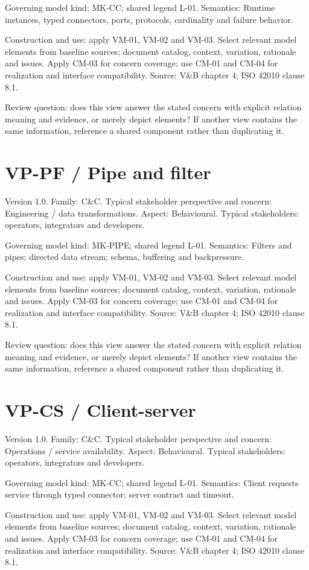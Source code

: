 \documentclass[11pt,letterpaper]{article}
\newcommand{\docsection}[1]{\Needspace{5\baselineskip}\section{#1}}
\begin{document}
Governing model kind: MK-CC; shared legend L-01. Semantics: Runtime instances, typed connectors, ports, protocols, cardinality and failure behavior.

Construction and use: apply VM-01, VM-02 and VM-03. Select relevant model elements from baseline sources; document catalog, context, variation, rationale and issues. Apply CM-03 for concern coverage; use CM-01 and CM-04 for realization and interface compatibility. Source: V\&B chapter 4; ISO 42010 clause 8.1.

Review question: does this view answer the stated concern with explicit relation meaning and evidence, or merely depict elements? If another view contains the same information, reference a shared component rather than duplicating it.

\docsection{VP-PF / Pipe and filter}
Version 1.0. Family: C\&C. Typical stakeholder perspective and concern: Engineering / data transformations. Aspect: Behavioural. Typical stakeholders: operators, integrators and developers.

Governing model kind: MK-PIPE; shared legend L-01. Semantics: Filters and pipes; directed data stream; schema, buffering and backpressure.

Construction and use: apply VM-01, VM-02 and VM-03. Select relevant model elements from baseline sources; document catalog, context, variation, rationale and issues. Apply CM-03 for concern coverage; use CM-01 and CM-04 for realization and interface compatibility. Source: V\&B chapter 4; ISO 42010 clause 8.1.

Review question: does this view answer the stated concern with explicit relation meaning and evidence, or merely depict elements? If another view contains the same information, reference a shared component rather than duplicating it.

\docsection{VP-CS / Client-server}
Version 1.0. Family: C\&C. Typical stakeholder perspective and concern: Operations / service availability. Aspect: Behavioural. Typical stakeholders: operators, integrators and developers.

Governing model kind: MK-CC; shared legend L-01. Semantics: Client requests service through typed connector; server contract and timeout.

Construction and use: apply VM-01, VM-02 and VM-03. Select relevant model elements from baseline sources; document catalog, context, variation, rationale and issues. Apply CM-03 for concern coverage; use CM-01 and CM-04 for realization and interface compatibility. Source: V\&B chapter 4; ISO 42010 clause 8.1.
\end{document}
